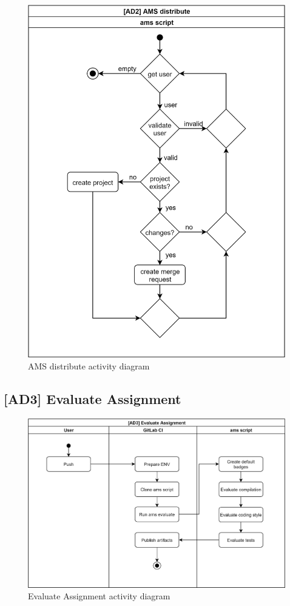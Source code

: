 \begin{figure}[H]
    \centering
    \includegraphics[width=\textwidth,height=.8\textheight,keepaspectratio]{Figures/ad/ad1.png}
    \caption{AMS distribute activity diagram}
\end{figure}

\subsection{{[}AD3{]} Evaluate Assignment} \label{ssec:ad3}

\begin{figure}[H]
    \centering
    \includegraphics[width=\textwidth,height=\textheight,keepaspectratio]{Figures/ad/ad13.png}
    \caption{Evaluate Assignment activity diagram}
\end{figure}

